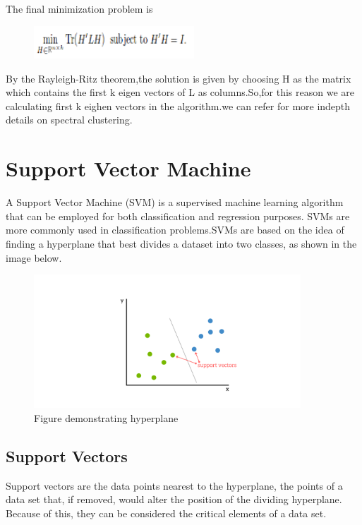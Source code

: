The final minimization problem is
\begin{figure} [!htbp]
\centering
\includegraphics[width=60mm]{Pictures/spec2.png}
\end{figure}

By the Rayleigh-Ritz theorem,the solution is given by choosing H as the matrix which contains the first k eigen vectors of L as columns.So,for this reason we are calculating first k eighen vectors in the algorithm.we can refer \cite{Spectral1} for more indepth details on spectral clustering.


\section{Support Vector Machine}

A Support Vector Machine (SVM) is a supervised machine learning algorithm that can be employed for both classification and regression purposes. SVMs are more commonly used in classification problems.SVMs are based on the idea of finding a hyperplane that best divides a dataset into two classes, as shown in the image below.

\begin{figure} [!htbp]
\centering
\includegraphics[width=100mm]{Pictures/svm1.png}
\caption{Figure demonstrating hyperplane}
\end{figure}

\subsection{Support Vectors}

Support vectors are the data points nearest to the hyperplane, the points of a data set that, if removed, would alter the position of the dividing hyperplane. Because of this, they can be considered the critical elements of a data set.

